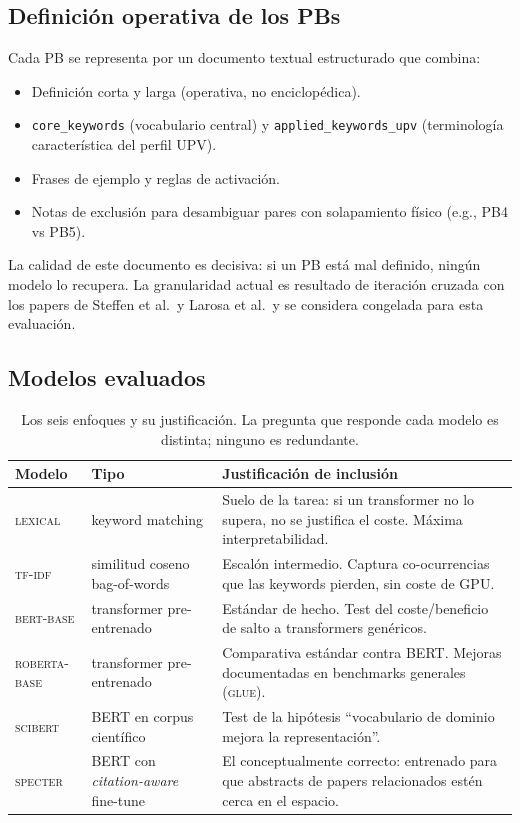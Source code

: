 \documentclass[11pt,a4paper]{article}
\begin{document}
\subsection{Definición operativa de los PBs}

Cada PB se representa por un documento textual estructurado que combina:
\begin{itemize}
\item Definición corta y larga (operativa, no enciclopédica).
\item \texttt{core\_keywords} (vocabulario central) y \texttt{applied\_keywords\_upv} (terminología característica del perfil UPV).
\item Frases de ejemplo y reglas de activación.
\item Notas de exclusión para desambiguar pares con solapamiento físico (e.g., PB4 vs PB5).
\end{itemize}
La calidad de este documento es decisiva: si un PB está mal definido, ningún modelo lo recupera. La granularidad actual es resultado de iteración cruzada con los papers de Steffen et al.~y Larosa et al.~y se considera congelada para esta evaluación.

\subsection{Modelos evaluados}

\begin{table}[h]
\centering
\small
\begin{tabularx}{\linewidth}{l l X}
\toprule
\textbf{Modelo} & \textbf{Tipo} & \textbf{Justificación de inclusión} \\
\midrule
\textsc{lexical} & keyword matching & Suelo de la tarea: si un transformer no lo supera, no se justifica el coste. Máxima interpretabilidad. \\
\textsc{tf-idf} & similitud coseno bag-of-words & Escalón intermedio. Captura co-ocurrencias que las keywords pierden, sin coste de GPU. \\
\textsc{bert-base} & transformer pre-entrenado & Estándar de hecho. Test del coste/beneficio de salto a transformers genéricos. \\
\textsc{roberta-base} & transformer pre-entrenado & Comparativa estándar contra BERT. Mejoras documentadas en benchmarks generales (\textsc{glue}). \\
\textsc{scibert} & BERT en corpus científico & Test de la hipótesis ``vocabulario de dominio mejora la representación''. \\
\textsc{specter} & BERT con \emph{citation-aware} fine-tune & El conceptualmente correcto: entrenado para que abstracts de papers relacionados estén cerca en el espacio. \\
\bottomrule
\end{tabularx}
\caption{Los seis enfoques y su justificación. La pregunta que responde cada modelo es distinta; ninguno es redundante.}
\end{table}
\end{document}
